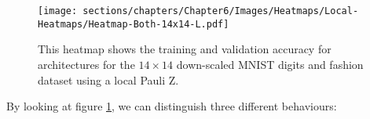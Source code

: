 \begin{figure}[h]
    \centering
    \texttt{[image: sections/chapters/Chapter6/Images/Heatmaps/Local-Heatmaps/Heatmap-Both-14x14-L.pdf]}
    \caption{This heatmap shows the training and validation accuracy for architectures for the $14\times14$ down-scaled MNIST digits and fashion dataset using a local Pauli Z.}
    \label{fig:heatmap-14x14-L}
\end{figure}

By looking at figure \ref{fig:heatmap-14x14-L}, we can distinguish 
three different behaviours: